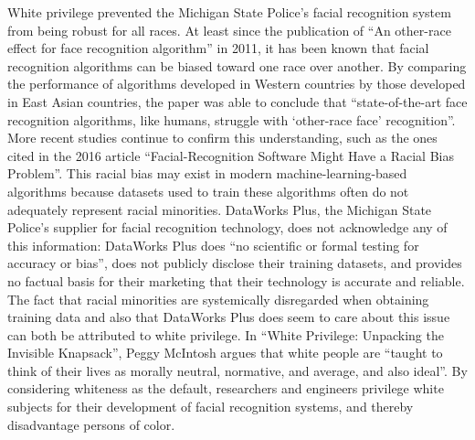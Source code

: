 \documentclass[12pt, letterpaper]{article}
\begin{document}
\begin{mla}
White privilege prevented the Michigan State Police's facial recognition
system from being robust for all races. At least since the publication of ``An
other-race effect for face recognition algorithm'' in 2011, it has been known
that facial recognition algorithms can be biased toward one race over another.
By comparing the performance of algorithms developed in Western countries by
those developed in East Asian countries, the paper was able to conclude that
``state-of-the-art face recognition algorithms, like humans, struggle with
`other-race face' recognition''. More recent studies continue to confirm this
understanding, such as the ones cited in the 2016 article ``Facial-Recognition
Software Might Have a Racial Bias Problem''. This racial bias may exist in
modern machine-learning-based algorithms because datasets used to train these
algorithms often do not adequately represent racial minorities. DataWorks
Plus, the Michigan State Police's supplier for facial recognition technology,
does not acknowledge any of this information: DataWorks Plus does ``no
scientific or formal testing for accuracy or bias'', does not publicly
disclose their training datasets, and provides no factual basis for their
marketing that their technology is accurate and reliable. The fact that racial
minorities are systemically disregarded when obtaining training data and also
that DataWorks Plus does seem to care about this issue can both be
attributed to white privilege. In ``White Privilege: Unpacking the Invisible
Knapsack'', Peggy McIntosh argues that white people are ``taught to think of
their lives as morally neutral, normative, and average, and also ideal''. By
considering whiteness as the default, researchers and engineers privilege
white subjects for their development of facial recognition systems, and
thereby disadvantage persons of color.


\end{mla}
\end{document}
